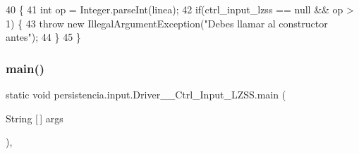 \begin{DoxyCode}
40                                                                                           \{
41         \textcolor{keywordtype}{int} op = Integer.parseInt(linea);
42         \textcolor{keywordflow}{if}(ctrl\_input\_lzss == null && op > 1) \{
43             \textcolor{keywordflow}{throw} \textcolor{keyword}{new} IllegalArgumentException(\textcolor{stringliteral}{"Debes llamar al constructor antes"});
44         \}
45     \}
\end{DoxyCode}
\mbox{\label{classpersistencia_1_1input_1_1Driver____Ctrl__Input__LZSS_a28b3106d1ed28319e5a7066c975da375}} 
\subsubsection{\texorpdfstring{main()}{main()}}
{\footnotesize\ttfamily static void persistencia.\+input.\+Driver\+\_\+\+\_\+\+Ctrl\+\_\+\+Input\+\_\+\+L\+Z\+S\+S.\+main (\begin{DoxyParamCaption}\item[{String \mbox{[}$\,$\mbox{]}}]{args }\end{DoxyParamCaption})\hspace{0.3cm}{\ttfamily [inline]}, {\ttfamily [static]}}


